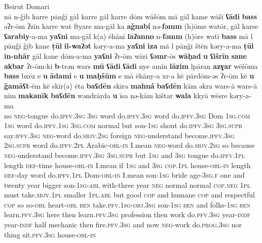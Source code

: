 \documentclass[output=paper]{langsci/langscibook}
\begin{document}
\ea
{Beirut Domari}\\ \label{speech}
\gll nā n-ǧib karre pānǧī gāl karre gāl karre dōm wāšōm mā gāl kame wāšī \textbf{ʕādi} \textbf{bass} əʔr-ōm ʔzīn karre wat ftyare ma-gāl ka \textbf{aǧnabí} nə-\textbf{fəmm} (h)ōme watōr, gāl karse \textbf{ʕarabiy}{}-a-ma \textbf{yaʕni} ma-gāl k(a) ēhānī \textbf{laʔanno} n-\textbf{fəmm} (h)ōre watī \textbf{bass} mā l pānǧī ǧib kane \textbf{ṭūl} \textbf{il-waʔət} kəry-a-ma \textbf{yaʕni} \textbf{iza} mā l pānǧi štēn kəry-a-ma \textbf{ṭūl} \textbf{in-nhār} gāl kane dōm-a-ma \textbf{yaʕni} ʔr-ōm wāri \textbf{ʕəmr}-ōs \textbf{wāḥad} \textbf{u} \textbf{ʕišrīn} \textbf{sane} \textbf{akbar} ʔr-ōm-ki \textbf{b}{}-trən wars  \textbf{mū} \textbf{ʕādi} \textbf{ʕādi} nye amīn \textbf{lāzim} lpāran \textbf{azɣar} wēšōma \textbf{bass} bxēz e \textbf{u} \textbf{ādami} e \textbf{u} \textbf{maḥšūm} e mā ēhāny-a xr-a kē pārdōm-əs ʔr-ōm kē \textbf{u} \textbf{ǧamāʕt}-ēm kē skīr(a) ēta \textbf{baʕdēn} skīra \textbf{mahná} \textbf{baʕdēn} kām əkra wars-ā wars-ā nīm \textbf{makanīk} \textbf{baʕdēn} wəndrārda \textbf{u} īsa nə-kām kištar \textbf{wala} kkyā wēsre kəry-a-ma\\
no \textsc{neg}{}-tongue do\textsc{.ipfv.3sg} \textsc{3sg} word do.\textsc{ipfv.3sg} word do\textsc{.ipfv.3sg} Dom \textsc{1sg.com} \textsc{1sg} word do.\textsc{ipfv.1sg} \textsc{3sg.com} normal but son-\textsc{1sg} shout do\textsc{.ipfv.3sg} \textsc{3sg.supr} say.\textsc{ipfv.3sg} \textsc{neg}{}-word do.\textsc{sbjv.2sg} foreign \textsc{neg}{}-understand become.\textsc{ipfv.3sg} \textsc{2sg.supr} word do.\textsc{ipfv.2pl} Arabic-\textsc{obl-in} I.mean \textsc{neg}{}-word do.\textsc{sbjv.2sg} so because \textsc{neg}{}-understand become.\textsc{ipfv.3sg} \textsc{3sg.supr} but \textsc{1sg} and \textsc{3sg} tongue do.\textsc{ipfv.1pl} length \textsc{def}{}-time house-\textsc{obl-in} I.mean if \textsc{1sg} and \textsc{3sg} \textsc{cop.1pl} house-\textsc{obl-in} length \textsc{def}{}-day word do\textsc{.ipfv.1pl} Dom-\textsc{obl-in} I.mean son-\textsc{1sg} bride age-\textsc{3sg.f} one and twenty year bigger son-\textsc{1sg-abl} with-three year \textsc{neg} normal normal \textsc{cop.neg} \textsc{1pl} must take\textsc{.sbjv.1pl} smaller \textsc{1pl.abl} but good \textsc{cop} and humane \textsc{cop} and respectful \textsc{cop} so so-\textsc{obl} heart-\textsc{obl} \textsc{ben} take.\textsc{pfv}.\textsc{1sg-obj.3sg} son-\textsc{1sg} \textsc{ben} and folks-\textsc{1sg} \textsc{ben} learn.\textsc{pfv.3sg} here then learn.\textsc{pfv.3sg} profession then work do.\textsc{pfv.3sg} year-\textsc{indf} year-\textsc{indf} half mechanic then fire.\textsc{pfv.3sg} and now \textsc{neg}-work do.\textsc{prog.3sg} nor thing sit.\textsc{pfv.3sg} house-\textsc{obl-in}\\
\end{document}
